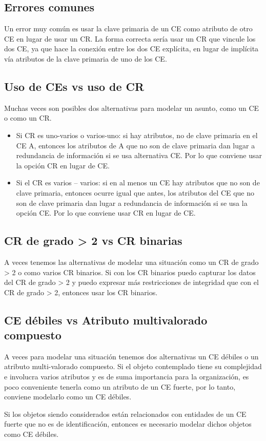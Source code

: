 \documentclass[12pt,a4paper]{report}
\begin{document}
		\subsection{Errores comunes}
			\par Un error muy común es usar la clave primaria de un CE como atributo de otro CE en lugar de usar un CR. La forma correcta sería usar un CR que vincule los dos CE, ya que hace la conexión entre los dos CE explícita, en lugar de implícita vía atributos de la clave primaria de uno de los CE.	
		
		\subsection{Uso de CEs vs uso de CR}
			\par Muchas veces son posibles dos alternativas para modelar un asunto, como un CE o como un CR.
			\begin{itemize}
				\item Si CR es uno-varios o varios-uno: si hay atributos, no de clave primaria en el CE A, entonces los atributos de A que no son de clave primaria dan lugar a redundancia de información si se usa alternativa CE. Por lo que conviene usar la opción CR en lugar de CE.
				\item Si el CR es varios – varios: si en al menos un CE hay atributos que no son de clave primaria, entonces ocurre igual que antes, los atributos del CE que no son de clave primaria dan lugar a redundancia de información si se usa la opción CE. Por lo que conviene usar CR en lugar de CE.
			\end{itemize}
		
		\subsection{CR de grado > 2 vs CR binarias}
			\par A veces tenemos las alternativas de modelar una situación como un CR de grado > 2 o como varios CR binarios. Si con los CR binarios puedo capturar los datos del CR de grado > 2 y puedo expresar más restricciones de integridad que con el CR de grado > 2, entonces usar los CR binarios.
		
		\subsection{CE débiles vs Atributo multivalorado compuesto}
			\par A veces para modelar una situación tenemos dos alternativas un CE débiles o un atributo multi-valorado compuesto. Si el objeto contemplado tiene su complejidad e involucra varios atributos y es de suma importancia para la organización, es poco conveniente tenerla como un atributo de un CE fuerte, por lo tanto, conviene modelarlo como un CE débiles.
			\par Si los objetos siendo considerados están relacionados con entidades de un CE fuerte que no es de identificación, entonces es necesario modelar dichos objetos como CE débiles.
		
\end{document}
